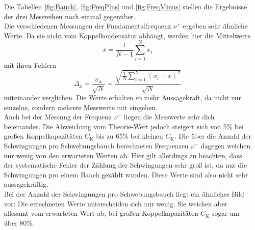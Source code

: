 Die Tabellen \ref{fig:Bauch}, \ref{fig:FreqPlus} und \ref{fig:FreqMinus} stellen die Ergebnisse der drei Messreihen noch einmal gegenüber. \\
Die verschiedenen Messungen der Fundamentalfrequenz $\nu^+$ ergeben sehr ähnliche Werte. Da sie nicht vom Koppelkondensator abhängt, werden hier die Mittelwerte
\[ \bar{x} = \frac{1}{N-1} \sum_{i=1}^\text{N} x_i \]
mit ihren Fehlern
\[ \Delta_{x} = \frac{\sigma_x}{\sqrt{N}} = \frac{\sqrt{\frac{1}{N} \sum_{i=1}^\text{N} (x_i - \bar{x})^2}}{\sqrt{N}} \]
miteinander verglichen. Die Werte erhalten so mehr Aussagekraft, da nicht nur einzelne, sondern mehrere Messwerte mit eingehen.
 \\
Auch bei der Messung der Frequenz $\nu^-$ liegen die Messwerte sehr dich beieinander. Die Abweichung vom Theorie-Wert jedoch steigert sich von 5\% bei großen Koppelkapazitäten $C_\text{K}$ bis zu 65\% bei kleinen $C_\text{K}$. Die über die Anzahl der Schwingungen pro Schwebungsbauch berechneten Frequenzen $\nu^-$ dagegen weichen nur wenig von den erwarteten Werten ab. Hier gilt allerdings zu beachten, dass der systematische Fehler der Zählung der Schwingungen sehr groß ist, da nur die Schwingungen pro einem Bauch gezählt wurden. Diese Werte sind also nicht sehr aussagekräftig.
 \\
Bei der Anzahl der Schwingungen pro Schwebungsbauch liegt ein ähnliches Bild vor: Die errechneten Werte unterscheiden sich nur wenig. Sie weichen aber allesamt vom erwarteten Wert ab, bei großen Koppelkapazitäten $C_\text{K}$ sogar um über 80\%.

